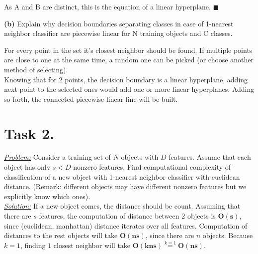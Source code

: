 \documentclass[a4paper,12pt]{article} %
\begin{document}
As A and B are distinct, this is the equation of a linear hyperplane. $\blacksquare$ \vspace{1.2em}

\textbf{(b)} Explain why decision boundaries separating classes in case of 1-nearest neighbor classifier are piecewise linear for N training objects and C classes.

For every point in the set it's closest neighbor should be found. If multiple points are close to one at the same time, a random one can be picked (or choose another method of selecting).\\
Knowing that for 2 points, the decision boundary is a linear hyperplane, adding next point to the selected ones would add one or more linear hyperplanes. Adding so forth, the connected piecewise linear line will be built. 

\newpage
\section*{Task 2.}
\underline{\textit{Problem:}} Consider a training set of $N$ objects with $D$ features. Assume that each object has only $s < D$ nonzero features. Find computational complexity of classification of a new object with 1-nearest neighbor classifier with euclidean distance. (Remark: different objects may have different nonzero features but we explicitly know which ones).\\
\newline
\underline{\textit{Solution:}} If a new object comes, the distance should be count. Assuming that there are $s$ features, the computation of distance between 2 objects is $\boldsymbol{O(s)}$, since (euclidean, manhattan) distance iterates over all features. Computation of distances to the rest objects will take $\boldsymbol{O(ns)}$, since there are $n$ objects. Because $k = 1$, finding $1$ closest neighbor will take $\boldsymbol{O(kns)} \overset{k=1}{=} \boldsymbol{O(ns)}$.
\end{document}
